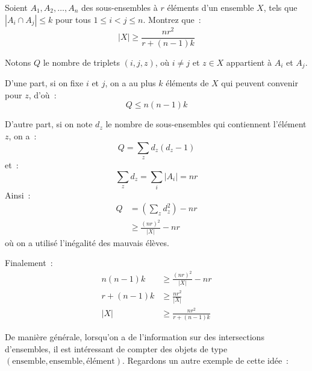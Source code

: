 \begin{exo}
	Soient $A_1, A_2, \dots, A_n$ des sous-ensembles à $r$ éléments d'un ensemble $X$, tels que $|A_i \cap A_j| \le k$ pour tous $1 \le i < j \le n$.
	Montrez que~:
	$$|X| \ge \frac{nr^2}{r + (n - 1)k}$$
\end{exo}
\begin{sol}
	Notons $Q$ le nombre de triplets $(i, j, z)$, où $i \ne j$ et $z \in X$ appartient à $A_i$ et $A_j$.
	
	D'une part, si on fixe $i$ et $j$, on a au plus $k$ éléments de $X$ qui peuvent convenir pour $z$, d'où~:
	$$Q \le n(n - 1) k$$
	
	D'autre part, si on note $d_z$ le nombre de sous-ensembles qui contiennent l'élément $z$, on a~:
	$$Q = \sum_z d_z(d_z - 1)$$
	et~:
	$$\sum_z d_z = \sum_i |A_i| = nr$$
	Ainsi~:
	\begin{align*}
	Q &= \left (\sum_z d_z^2 \right ) - nr \\
	&\ge \frac{(nr)^2}{|X|} - nr
	\end{align*}
	où on a utilisé l'inégalité des mauvais élèves.
	
	Finalement~:
	\begin{align*}
	n(n - 1) k &\ge \frac{(nr)^2}{|X|} - nr \\
	r + (n - 1) k &\ge \frac{nr^2}{|X|} \\
	|X| &\ge \frac{nr^2}{r + (n - 1)k}
	\end{align*}
\end{sol}

De manière générale, lorsqu'on a de l'information sur des intersections d'ensembles, il est intéressant de compter des objets de type $(\mbox{ensemble}, \mbox{ensemble}, \mbox{élément})$.
Regardons un autre exemple de cette idée~:

